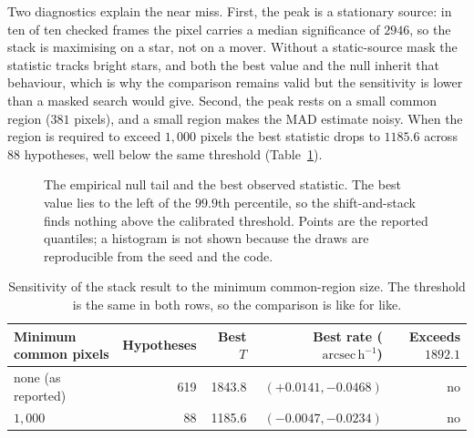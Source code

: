 \documentclass[11pt,a4paper]{article}
\newcommand{\unit}[1]{\,\mathrm{#1}}
\newcommand{\arcsec}{\unit{arcsec}}
\begin{document}
Two diagnostics explain the near miss. First, the peak is a stationary source: in
ten of ten checked frames the pixel carries a median significance of $2946$, so
the stack is maximising on a star, not on a mover. Without a static-source mask
the statistic tracks bright stars, and both the best value and the null inherit
that behaviour, which is why the comparison remains valid but the sensitivity is
lower than a masked search would give. Second, the peak rests on a small common
region ($381$ pixels), and a small region makes the MAD estimate noisy. When the
region is required to exceed $1{,}000$ pixels the best statistic drops to
$1185.6$ across $88$ hypotheses, well below the same threshold
(Table~\ref{tab:sensitivity}).

\begin{figure}[htbp]
\centering
{}
\caption{The empirical null tail and the best observed statistic. The best value
lies to the left of the $99.9$th percentile, so the shift-and-stack finds nothing
above the calibrated threshold. Points are the reported quantiles; a histogram is
not shown because the draws are reproducible from the seed and the code.}
\label{fig:null}
\end{figure}

\begin{table}[htbp]
\centering
\small
\caption{Sensitivity of the stack result to the minimum common-region size. The
threshold is the same in both rows, so the comparison is like for like.}
\label{tab:sensitivity}
\begin{tabular}{lrrrr}
\toprule
Minimum common pixels & Hypotheses & Best $T$ & Best rate ($\arcsec\unit{h}^{-1}$) & Exceeds $1892.1$ \\
\midrule
none (as reported) & 619 & 1843.8 & $(+0.0141,-0.0468)$ & no \\
$1{,}000$          & 88  & 1185.6 & $(-0.0047,-0.0234)$ & no \\
\bottomrule
\end{tabular}
\end{table}
\end{document}
